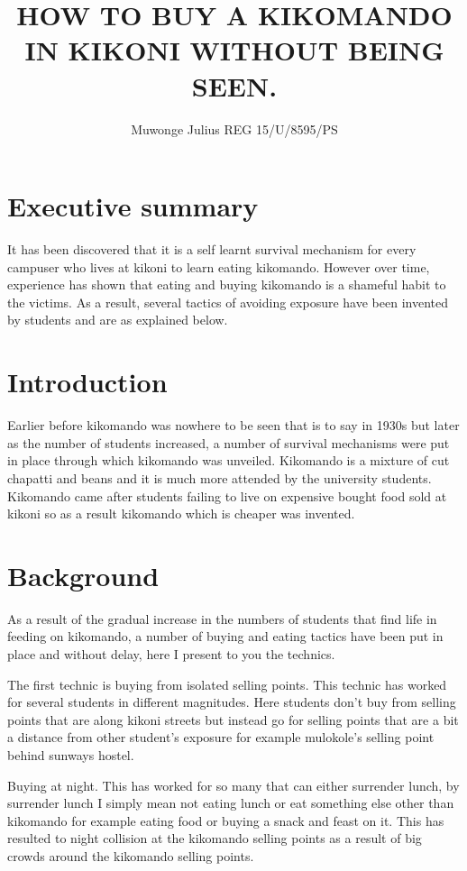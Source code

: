 \documentclass{article}
\begin{document}
\author{Muwonge Julius REG 15/U/8595/PS}
\title{HOW TO BUY A KIKOMANDO IN KIKONI WITHOUT BEING SEEN.}
\maketitle
\section{Executive summary}{It has been discovered that it is a self learnt survival mechanism for every campuser who lives at kikoni to learn eating kikomando. However over time, experience has shown that eating and buying kikomando is a shameful habit to the victims. As a result, several tactics of avoiding exposure have been invented by students and are as explained below.
}
\section{Introduction}{Earlier before kikomando was nowhere to be seen that is to say in 1930s but later as the number of students increased, a number of survival mechanisms were put in place through which kikomando was unveiled. Kikomando is a mixture of cut chapatti and beans and it is much more attended by the university students. Kikomando came after students failing to live on expensive bought food sold at kikoni so as a result kikomando which is cheaper was invented.
}
\section{Background}{As a result of the gradual increase in the numbers of students that find life in feeding on kikomando, a number of buying and eating tactics have been put in place and without delay, here I present to you the technics.
}

{The first technic is buying from isolated selling points. This technic has worked for several students in different magnitudes. Here students don’t buy from selling points that are along kikoni streets but instead go for selling points that are a bit a distance from other student’s exposure for example mulokole’s selling point behind sunways hostel.
}

{Buying at night. This has worked for so many that can either surrender lunch, by surrender lunch I simply mean not eating lunch or eat something else other than kikomando for example eating food or buying a snack and feast on it. This has resulted to night collision at the kikomando selling points as a result of big crowds around the kikomando selling points.
}
\end{document}
